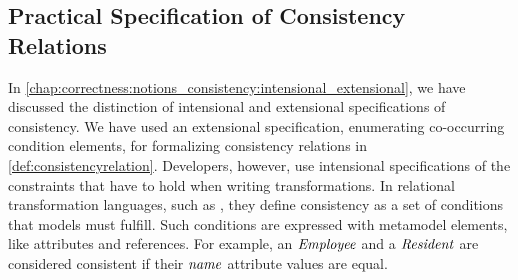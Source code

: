 


\subsection{Practical Specification of Consistency Relations}

In \autoref{chap:correctness:notions_consistency:intensional_extensional}, we have discussed the distinction of intensional and extensional specifications of consistency.
We have used an extensional specification, enumerating co-occurring condition elements, for formalizing consistency relations in \autoref{def:consistencyrelation}.
Developers, however, use intensional specifications of the constraints that have to hold when writing transformations.
In relational transformation languages, such as \qvtr, they define consistency as a set of conditions that models must fulfill.
Such conditions are expressed with metamodel elements, like attributes and references. 
For example, an $\mathit{Employee}$ and a $\mathit{Resident}$ are considered consistent if their $\mathit{name}$ attribute values are equal.

